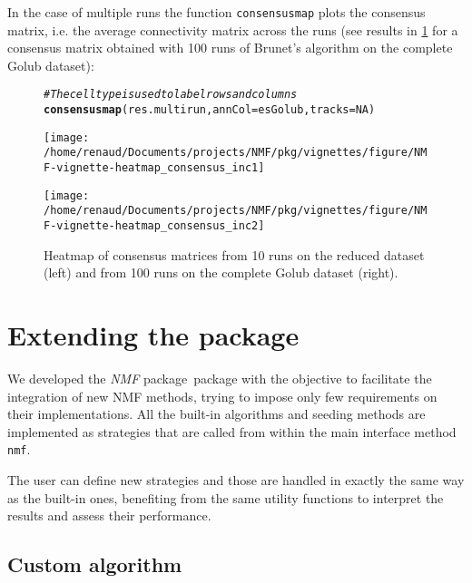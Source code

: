 \documentclass[a4paper]{article}\usepackage[]{graphicx}\usepackage[]{color}
\makeatletter
\newcommand{\hlnum}[1]{\textcolor[rgb]{0.686,0.059,0.569}{#1}}%
\newcommand{\hlcom}[1]{\textcolor[rgb]{0.678,0.584,0.686}{\textit{#1}}}%
\newcommand{\hlstd}[1]{\textcolor[rgb]{0.345,0.345,0.345}{#1}}%
\newcommand{\hlkwc}[1]{\textcolor[rgb]{0.333,0.667,0.333}{#1}}%
\newcommand{\hlkwd}[1]{\textcolor[rgb]{0.737,0.353,0.396}{\textbf{#1}}}%
\newenvironment{kframe}{%
 \def\at@end@of@kframe{}%
 \ifinner\ifhmode%
  \def\at@end@of@kframe{\end{minipage}}%
  \begin{minipage}{\columnwidth}%
 \fi\fi%
 \def\FrameCommand##1{\hskip\@totalleftmargin \hskip-\fboxsep
 \colorbox{shadecolor}{##1}\hskip-\fboxsep
     \hskip-\linewidth \hskip-\@totalleftmargin \hskip\columnwidth}%
 \MakeFramed {\advance\hsize-\width
   \@totalleftmargin\z@ \linewidth\hsize
   \@setminipage}}%
 {\par\unskip\endMakeFramed%
 \at@end@of@kframe}
\newenvironment{knitrout}{}{} %
\let\code=\texttt
\newcommand{\pkgname}[1]{\textit{#1}\xspace}
\newcommand{\Rpkg}[1]{\pkgname{#1} package\xspace}
\newcommand{\nmfpack}{\Rpkg{NMF}}
\makeatother
\begin{document}
In the case of multiple runs the function \code{consensusmap} plots the consensus matrix, i.e. the average connectivity matrix across the runs (see results in \cref{fig:heatmap_consensus} for a consensus matrix obtained with 100 runs of Brunet's algorithm on the complete 
Golub dataset):

\begin{figure}[ht]
\begin{knitrout}
\color{fgcolor}\begin{kframe}
\begin{alltt}
\hlcom{# The cell type is used to label rows and columns }
\hlkwd{consensusmap}\hlstd{(res.multirun,} \hlkwc{annCol}\hlstd{=esGolub,} \hlkwc{tracks}\hlstd{=}\hlnum{NA}\hlstd{)}
\end{alltt}
\end{kframe}
\texttt{[image: /home/renaud/Documents/projects/NMF/pkg/vignettes/figure/NMF-vignette-heatmap\_consensus\_inc1]} 

\texttt{[image: /home/renaud/Documents/projects/NMF/pkg/vignettes/figure/NMF-vignette-heatmap\_consensus\_inc2]} 

\end{knitrout}

\caption{Heatmap of consensus matrices from 10 runs on the reduced dataset
(left) and from 100 runs on the complete Golub dataset (right).}
\label{fig:heatmap_consensus}
\end{figure}
 
\section{Extending the package}

We developed the \nmfpack\ package with the objective to facilitate the integration of new NMF methods, trying to impose only few requirements on their implementations. 
All the built-in algorithms and seeding methods are implemented as strategies that are called from within the main interface method \code{nmf}. 

The user can define new strategies and those are handled in exactly the same way as the built-in ones, benefiting from the same utility functions to interpret the 
results and assess their performance. 

\subsection{Custom algorithm}
%
%
\end{document}
